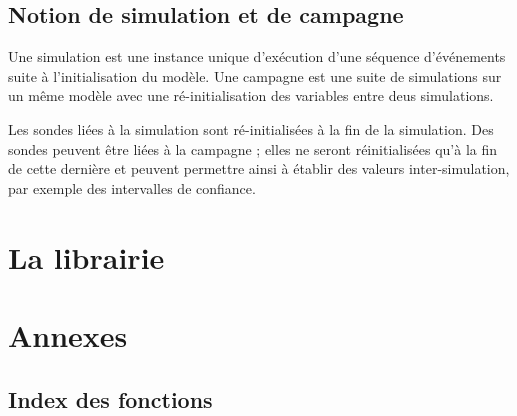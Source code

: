 \documentclass{book}
\begin{document}
\section{Notion de simulation et de campagne}

   Une simulation est une instance unique d'exécution d'une séquence
d'événements suite à l'initialisation du modèle. Une campagne est une
suite de simulations sur un même modèle avec une ré-initialisation des
variables entre deus simulations.

   Les sondes liées à la simulation sont ré-initialisées à la fin de
la simulation. Des sondes peuvent être liées à la campagne ; elles ne
seront réinitialisées qu'à la fin de cette dernière et peuvent
permettre ainsi à établir des valeurs inter-simulation, par exemple
des intervalles de confiance.

%
\chapter{La librairie}













%
\chapter{Annexes}

\section{Index des fonctions}

\printindex
\end{document}
